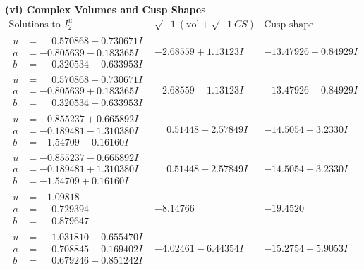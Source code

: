 \documentclass[1p]{elsarticle_modified}
\theoremstyle{definition}
\newcommand{\I}{\sqrt{-1}}
\begin{document}
\newpage\flushleft \textbf{(vi) Complex Volumes and Cusp Shapes}
$$\begin{array}{c|c|c}  
\text{Solutions to }I^u_{2}& \I (\text{vol} + \sqrt{-1}CS) & \text{Cusp shape}\\
 \hline 
\begin{aligned}
u &= \phantom{-}0.570868 + 0.730671 I \\
a &= -0.805639 - 0.183365 I \\
b &= \phantom{-}0.320534 - 0.633953 I\end{aligned}
 & -2.68559 + 1.13123 I & -13.47926 - 0.84929 I \\ \hline\begin{aligned}
u &= \phantom{-}0.570868 - 0.730671 I \\
a &= -0.805639 + 0.183365 I \\
b &= \phantom{-}0.320534 + 0.633953 I\end{aligned}
 & -2.68559 - 1.13123 I & -13.47926 + 0.84929 I \\ \hline\begin{aligned}
u &= -0.855237 + 0.665892 I \\
a &= -0.189481 - 1.310380 I \\
b &= -1.54709 - 0.16160 I\end{aligned}
 & \phantom{-}0.51448 + 2.57849 I & -14.5054 - 3.2330 I \\ \hline\begin{aligned}
u &= -0.855237 - 0.665892 I \\
a &= -0.189481 + 1.310380 I \\
b &= -1.54709 + 0.16160 I\end{aligned}
 & \phantom{-}0.51448 - 2.57849 I & -14.5054 + 3.2330 I \\ \hline\begin{aligned}
u &= -1.09818\phantom{ +0.000000I} \\
a &= \phantom{-}0.729394\phantom{ +0.000000I} \\
b &= \phantom{-}0.879647\phantom{ +0.000000I}\end{aligned}
 & -8.14766\phantom{ +0.000000I} & -19.4520\phantom{ +0.000000I} \\ \hline\begin{aligned}
u &= \phantom{-}1.031810 + 0.655470 I \\
a &= \phantom{-}0.708845 - 0.169402 I \\
b &= \phantom{-}0.679246 + 0.851242 I\end{aligned}
 & -4.02461 - 6.44354 I & -15.2754 + 5.9053 I \\ \hline\begin{aligned}

\end{aligned}
\end{array}$$
\end{document}
